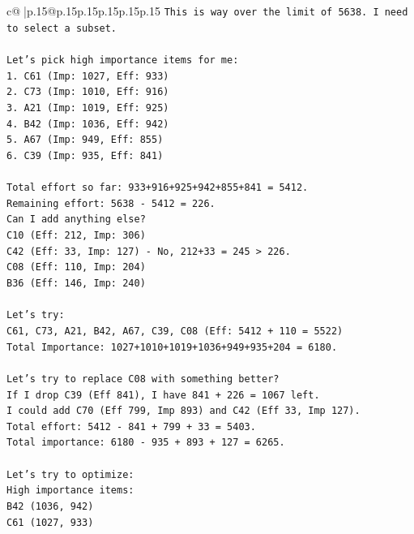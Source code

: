 \documentclass{article}
\begin{document}
{\begin{supertabular}{c@{$\;$}|p{.15\linewidth}@{}p{.15\linewidth}p{.15\linewidth}p{.15\linewidth}p{.15\linewidth}p{.15\linewidth}}
{{{\texttt{This is way over the limit of 5638. I need to select a subset.} \\
\\ 
\texttt{Let's pick high importance items for me:} \\
\texttt{1. C61 (Imp: 1027, Eff: 933)} \\
\texttt{2. C73 (Imp: 1010, Eff: 916)} \\
\texttt{3. A21 (Imp: 1019, Eff: 925)} \\
\texttt{4. B42 (Imp: 1036, Eff: 942)} \\
\texttt{5. A67 (Imp: 949, Eff: 855)} \\
\texttt{6. C39 (Imp: 935, Eff: 841)} \\
\\ 
\texttt{Total effort so far: 933+916+925+942+855+841 = 5412.} \\
\texttt{Remaining effort: 5638 {-} 5412 = 226.} \\
\texttt{Can I add anything else?} \\
\texttt{C10 (Eff: 212, Imp: 306)} \\
\texttt{C42 (Eff: 33, Imp: 127) {-} No, 212+33 = 245 > 226.} \\
\texttt{C08 (Eff: 110, Imp: 204)} \\
\texttt{B36 (Eff: 146, Imp: 240)} \\
\\ 
\texttt{Let's try:} \\
\texttt{C61, C73, A21, B42, A67, C39, C08 (Eff: 5412 + 110 = 5522)} \\
\texttt{Total Importance: 1027+1010+1019+1036+949+935+204 = 6180.} \\
\\ 
\texttt{Let's try to replace C08 with something better?} \\
\texttt{If I drop C39 (Eff 841), I have 841 + 226 = 1067 left.} \\
\texttt{I could add C70 (Eff 799, Imp 893) and C42 (Eff 33, Imp 127).} \\
\texttt{Total effort: 5412 {-} 841 + 799 + 33 = 5403.} \\
\texttt{Total importance: 6180 {-} 935 + 893 + 127 = 6265.} \\
\\ 
\texttt{Let's try to optimize:} \\
\texttt{High importance items:} \\
\texttt{B42 (1036, 942)} \\
\texttt{C61 (1027, 933)} \\
}}}
\end{supertabular}}
\end{document}
